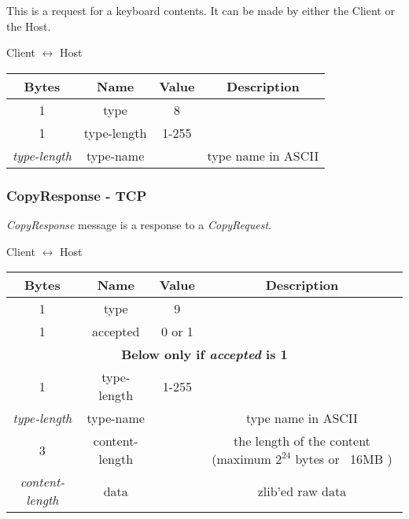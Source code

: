 \documentclass{article}
\begin{document}
    This is a request for a keyboard contents. It can be made by either the Client or the Host.

    \begin{center}
        Client $\leftrightarrow$ Host\\
        \begin{tabular}{|c|c|c|c|}
            \hline
            \textbf{Bytes}     & \textbf{Name} & \textbf{Value} & \textbf{Description} \\
            \hline
            1                  & type          & 8              &                      \\
            \hline
            1                  & type-length   & 1-255          &                      \\
            \hline
            \emph{type-length} & type-name     &                & type name in ASCII   \\
            \hline
        \end{tabular}
    \end{center}

    \subsubsection{CopyResponse - TCP}

    \emph{CopyResponse} message is a response to a \emph{CopyRequest}.

    \begin{center}
        Client $\leftrightarrow$ Host\\
        \begin{tabular}{|c|c|c|c|}
            \hline
            \textbf{Bytes}        & \textbf{Name} & \textbf{Value} & \textbf{Description} \\
            \hline
            1                     & type          & 9              &                      \\
            \hline
            1                     & accepted      & 0 or 1         &                      \\
            \hline
            \multicolumn{4}{|c|}{\textbf{Below only if \emph{accepted} is 1} } \\
            \hline
            1                     & type-length   & 1-255          &                      \\
            \hline
            \emph{type-length}    & type-name     &                & type name in ASCII   \\
            \hline
            3 & content-length & & the length of the content  (maximum $2^{24}$
            bytes or ~16MB ) \\
            \hline
            \emph{content-length} & data          &                & zlib'ed raw data     \\
            \hline
        \end{tabular}
    \end{center}
\end{document}
